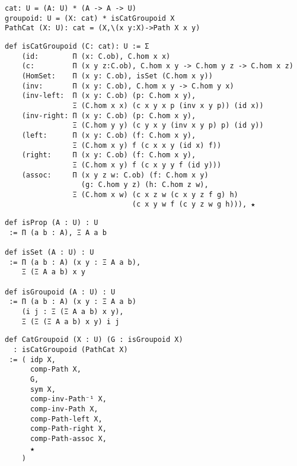 \documentclass{article}
\theoremstyle{definition}
\begin{document}
\begin{lstlisting}
cat: U = (A: U) * (A -> A -> U)
groupoid: U = (X: cat) * isCatGroupoid X
PathCat (X: U): cat = (X,\(x y:X)->Path X x y)
\end{lstlisting}

\begin{lstlisting}
def isCatGroupoid (C: cat): U := Σ
    (id:        Π (x: C.ob), C.hom x x)
    (c:         Π (x y z:C.ob), C.hom x y -> C.hom y z -> C.hom x z)
    (HomSet:    Π (x y: C.ob), isSet (C.hom x y))
    (inv:       Π (x y: C.ob), C.hom x y -> C.hom y x)
    (inv-left:  Π (x y: C.ob) (p: C.hom x y),
                Ξ (C.hom x x) (c x y x p (inv x y p)) (id x))
    (inv-right: Π (x y: C.ob) (p: C.hom x y),
                Ξ (C.hom y y) (c y x y (inv x y p) p) (id y))
    (left:      Π (x y: C.ob) (f: C.hom x y),
                Ξ (C.hom x y) f (c x x y (id x) f))
    (right:     Π (x y: C.ob) (f: C.hom x y),
                Ξ (C.hom x y) f (c x y y f (id y)))
    (assoc:     Π (x y z w: C.ob) (f: C.hom x y)
                  (g: C.hom y z) (h: C.hom z w),
                Ξ (C.hom x w) (c x z w (c x y z f g) h)
                              (c x y w f (c y z w g h))), ★
\end{lstlisting}

\newpage
\begin{lstlisting}
def isProp (A : U) : U
 := Π (a b : A), Ξ A a b

def isSet (A : U) : U
 := Π (a b : A) (x y : Ξ A a b),
    Ξ (Ξ A a b) x y

def isGroupoid (A : U) : U
 := Π (a b : A) (x y : Ξ A a b)
    (i j : Ξ (Ξ A a b) x y),
    Ξ (Ξ (Ξ A a b) x y) i j
\end{lstlisting}

\begin{lstlisting}
def CatGroupoid (X : U) (G : isGroupoid X)
  : isCatGroupoid (PathCat X)
 := ( idp X,
      comp-Path X,
      G,
      sym X,
      comp-inv-Path⁻¹ X,
      comp-inv-Path X,
      comp-Path-left X,
      comp-Path-right X,
      comp-Path-assoc X,
      ★
    )
\end{lstlisting}

\newpage
\end{document}
